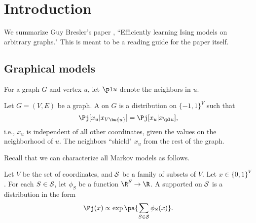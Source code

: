\def\filepath{C:/Users/Owner/Dropbox/Math/templates}





\newcommand{\cmt}[1]{(#1)}
%


%

\pagestyle{fancy}
\chead{} 
\rhead{} 
\lfoot{} 
\cfoot{\thepage} 
\rfoot{} 
\renewcommand{\headrulewidth}{.3pt} 
\setlength\voffset{0in}
\setlength\textheight{648pt}




\tableofcontents

\section{Introduction}
We summarize Guy Bresler's paper \autocite{Bre14}, ``Efficiently learning Ising models on arbitrary graphs." This is meant to be a reading guide for the paper itself.
\subsection{Graphical models}
For a graph $G$ and vertex $u$, let $\pl u$ denote the neighbors in $u$.
\begin{df}
Let $G=(V,E)$ be a graph.
A  on $G$ is a distribution on $\{-1,1\}^V$ such that 
\[
\Pj[x_u | x_{V\bs \{u\}}] = \Pj[x_u|x_{\pl u}],
\]
i.e., $x_u$ is independent of all other coordinates, given the values on the neighborhood of $u$. The neighbors ``shield" $x_u$ from the rest of the graph.
\end{df}

Recall that we can characterize all Markov models as follows. 
\begin{df}
Let $V$ be the set of coordinates, and $\cal S$ be a family of subsets of $V$. Let $x\in \{0,1\}^V$. 
For each $S\in \cal S$, let $\phi_S$ be a function $\R^S \to \R$. A  supported on $\cal S$ is a distribution in the form
\[
\Pj(x) \propto \exp\pa{\sum_{S\in \cal S} \phi_S(x)}.
\]
\end{df}

